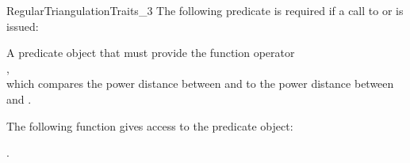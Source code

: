 \begin{ccRefConcept}{RegularTriangulationTraits_3}
The following predicate is required if  a call to
or  is issued: 

{A predicate object that must provide the function operator\\
,\\
which compares the power distance between  and  
to the power distance
between  and .}


\ccOperations

The following function gives access to the predicate object:



\ccHasModels

.

\end{ccRefConcept}
